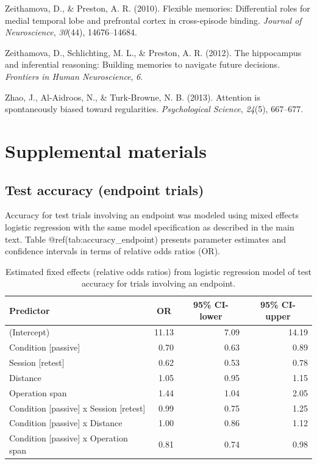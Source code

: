 \documentclass[floatsintext,man]{apa6}
\theoremstyle{definition}
\theoremstyle{definition}
\theoremstyle{definition}
\theoremstyle{remark}
\begin{document}
\hypertarget{ref-zeithamova2010flexible}{}
Zeithamova, D., \& Preston, A. R. (2010). Flexible memories:
Differential roles for medial temporal lobe and prefrontal cortex in
cross-episode binding. \emph{Journal of Neuroscience}, \emph{30}(44),
14676--14684.

\hypertarget{ref-zeithamova2012hippocampus}{}
Zeithamova, D., Schlichting, M. L., \& Preston, A. R. (2012). The
hippocampus and inferential reasoning: Building memories to navigate
future decisions. \emph{Frontiers in Human Neuroscience}, \emph{6}.

\hypertarget{ref-zhao2013attention}{}
Zhao, J., Al-Aidroos, N., \& Turk-Browne, N. B. (2013). Attention is
spontaneously biased toward regularities. \emph{Psychological Science},
\emph{24}(5), 667--677.

\endgroup

\section{Supplemental materials}\label{supplemental-materials}

\subsection{Test accuracy (endpoint
trials)}\label{test-accuracy-endpoint-trials}

Accuracy for test trials involving an endpoint was modeled using mixed
effects logistic regression with the same model specification as
described in the main text. Table @ref(tab:accuracy\_endpoint) presents
parameter estimates and confidence intervals in terms of relative odds
ratios (OR).

\begin{table}[tbp]
\begin{center}
\begin{threeparttable}
\caption{\label{tab:accuracy_endpoint}Estimated fixed effects (relative odds ratios) from logistic regression model of test accuracy for trials involving an endpoint.}
\small{
\begin{tabular}{lrrr}
\toprule
Predictor & \multicolumn{1}{c}{OR} & \multicolumn{1}{c}{95\% CI-lower} & \multicolumn{1}{c}{95\% CI-upper}\\
\midrule
(Intercept) & 11.13 & 7.09 & 14.19\\
Condition [passive] & 0.70 & 0.63 & 0.89\\
Session [retest] & 0.62 & 0.53 & 0.78\\
Distance & 1.05 & 0.95 & 1.15\\
Operation span & 1.44 & 1.04 & 2.05\\
Condition [passive] x Session [retest] & 0.99 & 0.75 & 1.25\\
Condition [passive] x Distance & 1.00 & 0.86 & 1.12\\
Condition [passive] x Operation span & 0.81 & 0.74 & 0.98\\
\bottomrule
\end{tabular}
}
\end{threeparttable}
\end{center}
\end{table}
\end{document}
